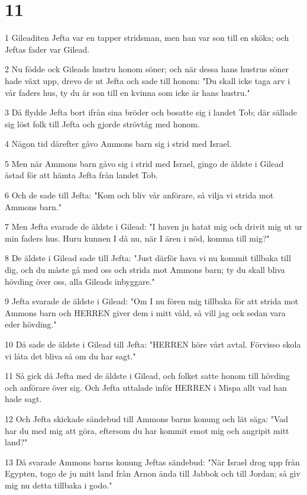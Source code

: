 \chapter{11}

\par 1 Gileaditen Jefta var en tapper stridsman, men han var son till en sköka; och Jeftas fader var Gilead.
\par 2 Nu födde ock Gileads hustru honom söner; och när dessa hans hustrus söner hade växt upp, drevo de ut Jefta och sade till honom: "Du skall icke taga arv i vår faders hus, ty du är son till en kvinna som icke är hans hustru."
\par 3 Då flydde Jefta bort ifrån sina bröder och bosatte sig i landet Tob; där sällade sig löst folk till Jefta och gjorde strövtåg med honom.
\par 4 Någon tid därefter gåvo Ammons barn sig i strid med Israel.
\par 5 Men när Ammons barn gåvo sig i strid med Israel, gingo de äldste i Gilead åstad för att hämta Jefta från landet Tob.
\par 6 Och de sade till Jefta: "Kom och bliv vår anförare, så vilja vi strida mot Ammons barn."
\par 7 Men Jefta svarade de äldste i Gilead: "I haven ju hatat mig och drivit mig ut ur min faders hus. Huru kunnen I då nu, när I ären i nöd, komma till mig?"
\par 8 De äldste i Gilead sade till Jefta: "Just därför hava vi nu kommit tillbaka till dig, och du måste gå med oss och strida mot Ammons barn; ty du skall bliva hövding över oss, alla Gileads inbyggare."
\par 9 Jefta svarade de äldste i Gilead: "Om I nu fören mig tillbaka för att strida mot Ammons barn och HERREN giver dem i mitt våld, så vill jag ock sedan vara eder hövding."
\par 10 Då sade de äldste i Gilead till Jefta: "HERREN höre vårt avtal. Förvisso skola vi låta det bliva så om du har sagt."
\par 11 Så gick då Jefta med de äldste i Gilead, och folket satte honom till hövding och anförare över sig. Och Jefta uttalade inför HERREN i Mispa allt vad han hade sagt.
\par 12 Och Jefta skickade sändebud till Ammons barns konung och lät säga: "Vad har du med mig att göra, eftersom du har kommit emot mig och angripit mitt land?"
\par 13 Då svarade Ammons barns konung Jeftas sändebud: "När Israel drog upp från Egypten, togo de ju mitt land från Arnon ända till Jabbok och till Jordan; så giv mig nu detta tillbaka i godo."
